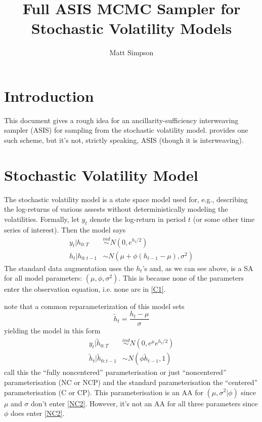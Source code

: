 \documentclass{article}
\author{Matt Simpson}
\title{Full ASIS MCMC Sampler for Stochastic Volatility Models}
\begin{document}
\maketitle

\section{Introduction}
This document gives a rough idea for an ancillarity-sufficiency interweaving sampler (ASIS) for sampling from the stochastic volatility model. \citet{kastner2013ancillarity} provides one such scheme, but it's not, strictly speaking, ASIS (though it is interweaving).

\section{Stochastic Volatility Model}

The stochastic volatility model is a state space model used for, e.g., describing the log-returns of various assests without deterministically modeling the volatilities. Formally, let $y_t$ denote the log-return in period $t$ (or some other time series of interest). Then the model says
\begin{align}
y_t|h_{0:T} & \stackrel{ind}{\sim}N(0, e^{h_t/2}) \label{C1}\\
h_t |h_{0:t-1} &\sim N( \mu + \phi(h_{t-1}-\mu), \sigma^2) \label{C2}
\end{align}
The standard data augmentation uses the $h_t$'s and, as we can see above, is a SA for all model parameters: $(\mu, \phi, \sigma^2)$. This is because none of the parameters enter the observation equation, i.e. none are in \ref{C1}.  

\citeauthor{kastner2013ancillarity} note that a common reparameterization of this model sets
\[
\tilde{h}_t = \frac{h_t - \mu}{\sigma}
\]
yielding the model in this form
\begin{align}
y_t|\tilde{h}_{0:T} & \stackrel{ind}{\sim}N(0, e^\mu e^{h_t/2}) \label{NC1}\\
\tilde{h}_t|\tilde{h}_{0:t-1} & \sim N(\phi\tilde{h}_{t-1}, 1) \label{NC2}
\end{align}
\citeauthor{kastner2013ancillarity} call this the ``fully noncentered'' parameterisation or just ``noncentered'' parameterisation (NC or NCP) and the standard parameterisation the ``centered'' parameterisation (C or CP). This parameterisation is an AA for $(\mu,\sigma^2|\phi)$ since $\mu$ and $\sigma$ don't enter \ref{NC2}. However, it's not an AA for all three parameters since $\phi$ does enter \ref{NC2}.
\end{document}

